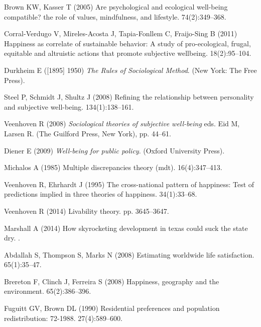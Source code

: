 \documentclass[10pt, letterpaper]{article}
\begin{document}
\begin{spacing}{1.4}
\begin{thebibliography}{10}
Brown KW, Kasser T (2005) Are psychological and ecological well-being
  compatible? the role of values, mindfulness, and lifestyle.
 74(2):349--368.

Corral-Verdugo V, Mireles-Acosta J, Tapia-Fonllem C, Fraijo-Sing B (2011)
  Happiness as correlate of sustainable behavior: A study of pro-ecological,
  frugal, equitable and altruistic actions that promote subjective wellbeing.
 18(2):95--104.

Durkheim E ([1895] 1950) {\em The Rules of Sociological Method}.
\newblock (New York: The Free Press).

Steel P, Schmidt J, Shultz J (2008) Refining the relationship between
  personality and subjective well-being.
 134(1):138--161.

Veenhoven R (2008) {\em Sociological theories of subjective well-being} eds.{}
  Eid M, Larsen R.
\newblock (The Guilford Press, New York), pp. 44--61.

Diener E (2009) {\em Well-being for public policy}.
\newblock (Oxford University Press).

Michalos A (1985) Multiple discrepancies theory (mdt).
 16(4):347--413.

Veenhoven R, Ehrhardt J (1995) The cross-national pattern of happiness: Test of
  predictions implied in three theories of happiness.
 34(1):33--68.

Veenhoven R (2014) Livability theory.
 pp.
  3645--3647.

Marshall A (2014) How skyrocketing development in texas could suck the state
  dry.
.

Abdallah S, Thompson S, Marks N (2008) Estimating worldwide life satisfaction.
 65(1):35--47.

Brereton F, Clinch J, Ferreira S (2008) Happiness, geography and the
  environment.
 65(2):386--396.

Fuguitt GV, Brown DL (1990) Residential preferences and population
  redistribution: 72-1988.
 27(4):589--600.


\end{thebibliography}
\end{spacing}
\end{document}
